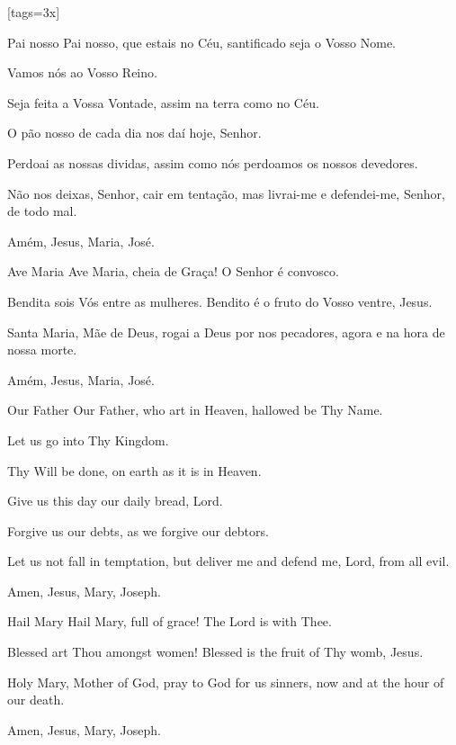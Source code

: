 \scleardpage
{}[tags={3x}]
  \vspace*{6ex}
  \begin{passage}[PT]{Pai nosso}
    Pai nosso,
    que estais no Céu,
    santificado seja o Vosso Nome.
    \par
    Vamos nós ao Vosso Reino.
    \par
    Seja feita a Vossa Vontade,
    assim na terra como no Céu.
    \par
    O pão nosso de cada dia nos daí hoje, Senhor.
    \par
    Perdoai as nossas dividas,
    assim como nós perdoamos os nossos devedores.
    \par
    Não nos deixas, Senhor, cair em tentação,
    mas livrai-me e defendei-me, Senhor,
    de todo mal.
    \par
    Amém, Jesus, Maria, José.
  \end{passage}
  \begin{passage}[PT]{Ave Maria}
    Ave Maria,
    cheia de Graça!
    O Senhor é convosco.
    \par
    Bendita sois Vós entre as mulheres.
    Bendito é o fruto do Vosso ventre, Jesus.
    \par
    Santa Maria, Mãe de Deus,
    rogai a Deus por nos pecadores,
    agora e na hora de nossa morte.
    \par
    Amém, Jesus, Maria, José.
  \end{passage}
  \vspace{\fill}
  \hardbrk
  \vspace*{11.5ex} %
  \begin{passage}[EN]{Our Father}
    Our Father,
    who art in Heaven,
    hallowed be Thy Name.
    \par
    Let us go into Thy Kingdom.
    \par
    Thy Will be done,
    on earth as it is in Heaven.
    \par
    Give us this day our daily bread, Lord.
    \par
    Forgive us our debts,
    as we forgive our debtors.
    \par
    Let us not fall in temptation,
    but deliver me and defend me, Lord,
    from all evil.
    \par
    Amen, Jesus, Mary, Joseph.
  \end{passage}
  \begin{passage}[EN]{Hail Mary}
    Hail Mary,
    full of grace!
    The Lord is with Thee.
    \par
    Blessed art Thou amongst women!
    Blessed is the fruit of Thy womb, Jesus.
    \par
    Holy Mary, Mother of God,
    pray to God for us sinners,
    now and at the hour of our death.
    \par
    Amen, Jesus, Mary, Joseph.
  \end{passage}
